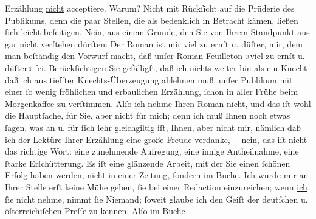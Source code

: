 \begin{ledgroupsized}[t]{13cm}
               Erzählung \uline{nicht} acceptiere.\pend
           \pstart
           Warum? Nicht mit Rückſicht auf die Prüderie des Publikums, denn die paar Stellen, die
               als bedenklich in Betracht kämen, ließen ſich leicht beſeitigen. Nein, aus einem
               Grunde, den Sie von Ihrem Standpunkt aus gar nicht verſtehen dürften: Der Roman ist mir viel zu ernſt u.
               düſter, mir, dem man beſtändig den Vorwurf macht, daß unſer Roman-Feuilleton »viel zu
               ernſt u. düſter« ſei. Berückſichtigen Sie gefälligſt, daß ich nichts weiter bin als
               ein Knecht \label{T_L00186-1v}\label{T_L00186-1h} daß ich aus
               tiefſter Knechts-Überzeugung ablehnen muß, unſer Publikum mit einer ſo wenig
               fröhlichen und erbaulichen Erzählung, ſchon in aller Frühe beim Morgenkaffee zu
               verſtimmen.\pend
           \pstart
           Alſo ich nehme Ihren Roman
               nicht, und das iſt wohl die Hauptſache, für Sie, aber nicht für mich; denn ich muß
               Ihnen noch etwas ſagen, was an u. für ſich ſehr gleichgiltig iſt, Ihnen, aber nicht
               mir, nämlich daß {\pb}\uline{ich} der Lektüre Ihrer Erzählung eine große Freude verdanke, – nein, das iſt
                   nicht das richtige Wort: eine zunehmende Aufregung, eine innige
               Antheilnahme, eine ſtarke Erſchütterung. Es iſt eine glänzende Arbeit, mit der Sie
               einen ſchönen Erfolg haben werden, nicht in einer Zeitung, ſondern im Buche. Ich
               würde mir an Ihrer Stelle erſt keine Mühe geben, ſie bei einer Redaction
               einzureichen; wenn \uline{ich}{ }ſie nicht nehme, nimmt ſie Niemand; ſoweit glaube
               ich den Geiſt der deutſchen u. öſterreichiſchen Preſſe zu kennen. Alſo im Buche

\end{ledgroupsized}
